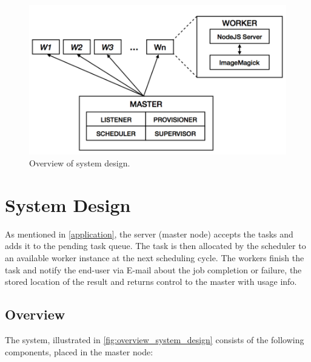 \documentclass[a4paper]{IEEEtran}
\begin{document}
\begin{figure}[tbp]
  \centering
    \includegraphics[width=\columnwidth]{system-design.png}
  \caption{Overview of system design.}
  \label{fig:overview_system_design}
\end{figure}

\section{System Design} \label{system_design}

As mentioned in \autoref{application}, the server (master node) accepts the tasks and adds it to the pending task queue. The task is then allocated by the scheduler to an available worker instance at the next scheduling cycle. The workers finish the task and notify the end-user via E-mail about the job completion or failure, the stored location of the result and returns control to the master with usage info.

\subsection{Overview} \label{system_design_overview}

The system, illustrated in \autoref{fig:overview_system_design} consists of the following components, placed in the master node:
\end{document}

